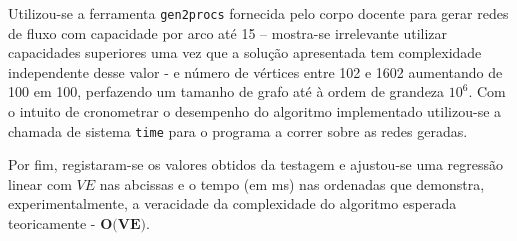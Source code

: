 \documentclass[12pt]{article}
\begin{document}
Utilizou-se a ferramenta \texttt{gen2procs} fornecida pelo corpo docente para gerar redes de fluxo com capacidade por arco até 15 – mostra-se irrelevante utilizar capacidades superiores uma vez que a solução apresentada tem complexidade independente desse valor - e número de vértices entre 102 e 1602 aumentando de 100 em 100, perfazendo um tamanho de grafo até à ordem de grandeza $10^6$. Com o intuito de cronometrar o desempenho do algoritmo implementado utilizou-se a chamada de sistema \texttt{time} para o programa a correr sobre as redes geradas.
\begin{center}
\end{center}

Por fim, registaram-se os valores obtidos da testagem e ajustou-se uma regressão linear com $VE$ nas abcissas e o tempo (em ms) nas ordenadas que demonstra, experimentalmente, a veracidade da complexidade do algoritmo esperada teoricamente - $\textbf{O(VE)}$.
\end{document}
